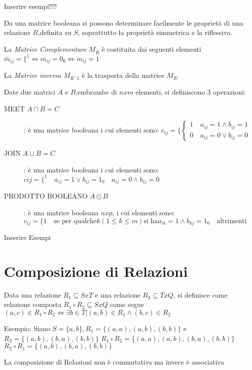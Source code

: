 Inserire esempi!!!!

Da una matrice booleana si possono determinare facilmente le proprietà
di una relazione $R$,definita su $S$, soprattutto la proprietà simmetrica e la riflessiva.

La \emph{Matrice Complementare} $M_{\bar{R}}$ è costituita dai seguenti elementi
$\bar{m}_{ij} = \{ ^ 1 \iff m_{ij} = 0 _ 0 \iff m_{ij} = 1$

La \emph{Matrice inversa} $M_{R ^-1}$ è la trasporta della matrice $M_R$.

Date due matrici $A$ e $B$,embrambe di $n x m$ elementi, si definiscono 3 operazioni:
\begin{description}
    \item[MEET $A \sqcap B = C$]: è una matrice booleana i cui elementi sono:
$c_{ij} = \{ \begin{cases} 1 \quad a_{ij} = 1 \land b_{ij} = 1 \\ 0 \quad a_{ij} = 0 \lor b_{ij} = 0 \end{cases}$
    \item[JOIN $A \sqcup B = C$]: è una matrice booleana i cui elementi sono:
    $c{ij} = \{ ^ 1 \quad a_{ij} = 1 \lor b_{ij} = 1 _ 0 \quad a_{ij} = 0 \land b_{ij} = 0$
    \item[PRODOTTO BOOLEANO $A \odot B$]: è una matrice booleana $n x p$, i cui elementi sono:
    $c_{ij} = \{1 \quad \text{se per qualche} k(1 \leq k \leq m) \text{si ha} a_{ik} = 1 \land b_{kj} = 1
    _ 0 \quad \text{altrimenti}$
\end{description}

Inserire Esempi

\section{Composizione di Relazioni}
Data una relazione $R_1 \subseteq S x T$ e una relazione $R_2 \subseteq T x Q$,
si definisce come relazione composta $R_1 \circ R_2 \subseteq S x Q$ come segue
$(a,c) \in R_1 \circ R_2 \iff \exists b \in T | (a,b) \in R_1 \land (b,c) \in R_2$

Esempio:
Siano $S = \{ a,b \}, R_1 = \{ (a,a),(a,b),(b,b) \}$ e $R_2 = \{ (a,b),(b,a),(b,b) \}$
$R_1 \circ R_2 = \{ (a,a),(a,b),(b,a),(b,b) \}$ \newline
$R_2 \circ R_1 = \{ (a,b),(b,a),(b,b) \}$

\begin{prop}
La composizione di Relazioni non è commutativa ma invece è associativa
\end{prop}

